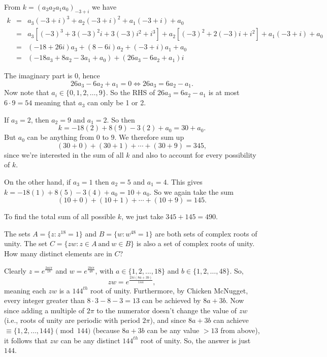 \begin{solution}[name={Solution by joml88}]
	From $k=(a_3a_2a_1a_0)_{-3+i}$ we have
	\begin{eqnarray*} k &=& a_3(-3+i)^3 + a_2(-3+i)^2 + a_1(-3+i) + a_0\\ &=& a_3\left[(-3)^3+3(-3)^2i+3(-3)i^2+i^3\right] + a_2\left[(-3)^2 + 2(-3)i + i^2\right] +a_1(-3+i) + a_0\\ &=& (-18 + 26i)a_3 + (8-6i)a_2 + (-3+i)a_1 + a_0\\ &=& (-18a_3+8a_2-3a_1+a_0) + (26a_3-6a_2+a_1)i \end{eqnarray*}
	
	The imaginary part is $0$, hence $$26a_3-6a_2+a_1=0\Leftrightarrow 26a_3=6a_2-a_1.$$ Now note that $a_i\in\{0,1,2,\ldots,9\}$. So the RHS of $26a_3 = 6a_2 -a_1$ is at most $6\cdot 9=54$ meaning that $a_3$ can only be 1 or 2.
	
	If $a_3=2$, then $a_2=9$ and $a_1=2$. So then $$k= -18(2) + 8(9) - 3(2) + a_0=30+a_0.$$ But $a_0$ can be anything from $0$ to $9$. We therefore sum up $$(30+0)+(30+1)+\cdots+(30+9)=345,$$ since we're interested in the sum of all $k$ and also to account for every possibility of $k$.
	
	On the other hand, if $a_3=1$ then $a_2=5$ and $a_1=4$. This gives $k= -18(1) + 8(5) - 3(4) + a_0 = 10+a_0$. So we again take the sum $$(10+0)+(10+1)+\cdots+(10+9)=145.$$
	
	To find the total sum of all possible $k$, we just take $345+145=\boxed{490}$.
\end{solution}







\begin{question}[name={1990 AIME, \href{https://artofproblemsolving.com/community/c4p459508}{Problem 10}}]
	The sets $A = \{z : z^{18} = 1\}$ and $B = \{w : w^{48} = 1\}$ are both sets of complex roots of unity. The set $C = \{zw : z \in A \ \text{and} \ w \in B\}$ is also a set of complex roots of unity. How many distinct elements are in $C$?	
\end{question}


\begin{solution}[name={Solution by cobbler}]
	Clearly $z=e^{\frac{2ai\pi}{18}}$ and $w=e^{\frac{2bi\pi}{48}}$, with $a\in \{1,2,...,18\}$ and $b\in \{1,2,\dots,48\}$. So, $$zw=e^{\frac{2\pi i(8a+3b)}{144}},$$ meaning each $zw$ is a $144^{th}$ root of unity. Furthermore, by Chicken McNugget, every integer greater than $8\cdot 3 - 8 - 3=13$ can be achieved by $8a+3b$. Now since adding a multiple of $2\pi$ to the numerator doesn't change the value of $zw$ (i.e., roots of unity are periodic with period $2\pi$), and since $8a+3b$ can achieve $\equiv \{1,2,\dots,144\}\pmod {144}$ (because $8a+3b$ can be any value $>13$ from above), it follows that $zw$ can be any distinct $144^{th}$ root of unity. So, the answer is just $\boxed{144}$.
\end{solution}













